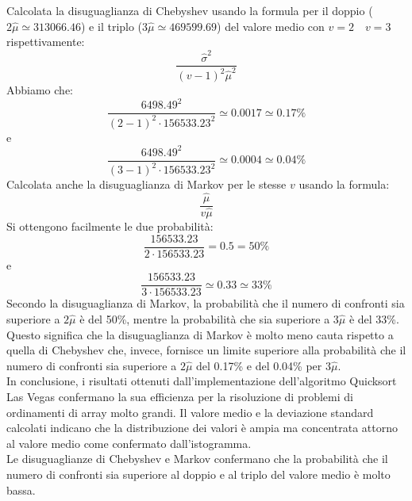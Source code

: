 \documentclass[12pt]{article}
\begin{document}
Calcolata la disuguaglianza di Chebyshev usando la formula per il 
doppio ($2\hat{\mu}\simeq 313066.46$) e il triplo ($3\hat{\mu} \simeq 469599.69$) del valore medio con $v=2 \quad v=3$ rispettivamente:
\begin{equation*}
    \frac{\hat{\sigma}^{2}}{(v-1)^{2}\hat{\mu}^{2}}
\end{equation*}
Abbiamo che:
\begin{equation*}
    \frac{6498.49^{2}}{(2-1)^{2}\cdot 156533.23^{2}} \simeq 0.0017 
    \simeq 0.17\%
\end{equation*}
e
\begin{equation*}
    \frac{6498.49^{2}}{(3-1)^{2}\cdot 156533.23^{2}} \simeq 0.0004 
    \simeq 0.04\%
\end{equation*}
Calcolata anche la disuguaglianza di Markov per le stesse $v$ usando la formula:
\begin{equation*}
    \frac{\hat{\mu}}{v\hat{\mu}}
\end{equation*}
Si ottengono facilmente le due probabilità:
\begin{equation*}
    \frac{156533.23}{2\cdot 156533.23} = 0.5 = 50\%
\end{equation*}
e
\begin{equation*}
    \frac{156533.23}{3\cdot 156533.23} \simeq 0.33 \simeq 33\%
\end{equation*}
Secondo la disuguaglianza di Markov, la probabilità che il numero di confronti
sia superiore a $2\hat{\mu}$ è del 50\%, mentre la probabilità che sia
superiore a $3\hat{\mu}$ è del 33\%. Questo significa che la disuguaglianza
di Markov è molto meno cauta rispetto a quella di Chebyshev che, invece, 
fornisce un limite superiore alla probabilità che il numero di confronti
sia superiore a $2\hat{\mu}$ del 0.17\% e del 0.04\% per $3\hat{\mu}$.\\
In conclusione, i risultati ottenuti dall'implementazione dell'algoritmo 
Quicksort Las Vegas confermano la sua efficienza per la risoluzione di
problemi di ordinamenti di array molto grandi. Il valore medio e la 
deviazione standard calcolati indicano che la distribuzione dei valori
è ampia ma concentrata attorno al valore medio come confermato dall'istogramma.\\
Le disuguaglianze di Chebyshev e Markov confermano che la probabilità
che il numero di confronti sia superiore al doppio e al triplo del valore 
medio è molto bassa.
\end{document}
